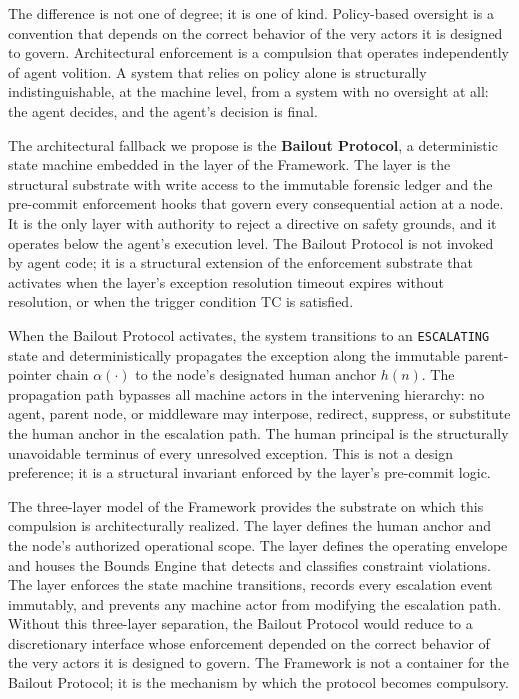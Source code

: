 The difference is not one of degree; it is one of kind. Policy-based oversight is a convention that depends on the correct behavior of the very actors it is designed to govern. Architectural enforcement is a compulsion that operates independently of agent volition. A system that relies on policy alone is structurally indistinguishable, at the machine level, from a system with no oversight at all: the agent decides, and the agent's decision is final.

The architectural fallback we propose is the \textbf{Bailout Protocol}, a deterministic state machine embedded in the \fact{} layer of the \bxthree{} Framework. The \fact{} layer is the structural substrate with write access to the immutable forensic ledger and the pre-commit enforcement hooks that govern every consequential action at a node. It is the only layer with authority to reject a directive on safety grounds, and it operates below the agent's execution level. The Bailout Protocol is not invoked by agent code; it is a structural extension of the enforcement substrate that activates when the \bounds{} layer's exception resolution timeout expires without resolution, or when the trigger condition TC is satisfied.

When the Bailout Protocol activates, the system transitions to an \texttt{ESCALATING} state and deterministically propagates the exception along the immutable parent-pointer chain $\alpha(\cdot)$ to the node's designated human anchor $h(n)$. The propagation path bypasses all machine actors in the intervening hierarchy: no agent, parent node, or middleware may interpose, redirect, suppress, or substitute the human anchor in the escalation path. The human principal is the structurally unavoidable terminus of every unresolved exception. This is not a design preference; it is a structural invariant enforced by the \fact{} layer's pre-commit logic.

The three-layer model of the \bxthree{} Framework provides the substrate on which this compulsion is architecturally realized. The \purpose{} layer defines the human anchor and the node's authorized operational scope. The \bounds{} layer defines the operating envelope and houses the Bounds Engine that detects and classifies constraint violations. The \fact{} layer enforces the state machine transitions, records every escalation event immutably, and prevents any machine actor from modifying the escalation path. Without this three-layer separation, the Bailout Protocol would reduce to a discretionary interface whose enforcement depended on the correct behavior of the very actors it is designed to govern. The \bxthree{} Framework is not a container for the Bailout Protocol; it is the mechanism by which the protocol becomes compulsory.

